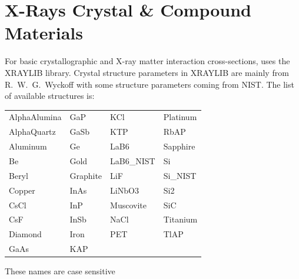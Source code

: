 \section{X-Rays Crystal \& Compound Materials}
\label{s:cryst.list}

For basic crystallographic and X-ray matter interaction cross-sections, \bmad uses the
XRAYLIB\cite{b:xraylib} library. Crystal structure parameters in XRAYLIB are mainly from
R.~W.~G.~Wyckoff\cite{b:wyckoff} with some structure parameters coming from NIST. The list of
available structures is:
\begin{center}
\begin{tabular}{llll} \toprule
AlphaAlumina & GaP       & KCl        & Platinum  \\
AlphaQuartz  & GaSb      & KTP        & RbAP      \\
Aluminum     & Ge        & LaB6       & Sapphire  \\
Be           & Gold      & LaB6_NIST  & Si        \\
Beryl        & Graphite  & LiF        & Si_NIST   \\
Copper       & InAs      & LiNbO3     & Si2       \\
CsCl         & InP       & Muscovite  & SiC       \\
CsF          & InSb      & NaCl       & Titanium  \\
Diamond      & Iron      & PET        & TlAP      \\
GaAs         & KAP       &            &           \\ \bottomrule
\end{tabular}
\end{center}
These names are case sensitive

